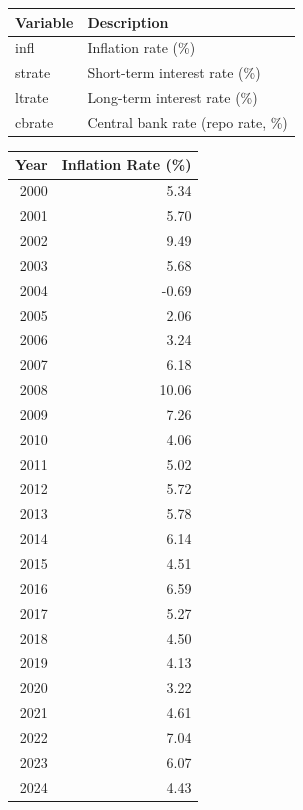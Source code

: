 \documentclass[11pt,preprint]{elsarticle}
\let\origtable\table
\let\endorigtable\endtable
\renewenvironment{table}[1][2] {
    \expandafter\origtable\expandafter[H]
} {
    \endorigtable
}
\numberwithin{equation}{section}
\numberwithin{figure}{section}
\numberwithin{table}{section}
\begin{document}
\begin{table}[H]
\centering
\begin{tabular}{ll}
  \hline
Variable & Description \\ 
  \hline
infl & Inflation rate (\%) \\ 
  strate & Short-term interest rate (\%) \\ 
  ltrate & Long-term interest rate (\%) \\ 
  cbrate & Central bank rate (repo rate, \%) \\ 
   \hline
\end{tabular}
\caption{Variable Descriptions\label{tab21}} 
\end{table}

\begin{table}[H]
\centering
\begin{tabular}{rr}
  \hline
Year & Inflation Rate (\%) \\ 
  \hline
2000 & 5.34 \\ 
  2001 & 5.70 \\ 
  2002 & 9.49 \\ 
  2003 & 5.68 \\ 
  2004 & -0.69 \\ 
  2005 & 2.06 \\ 
  2006 & 3.24 \\ 
  2007 & 6.18 \\ 
  2008 & 10.06 \\ 
  2009 & 7.26 \\ 
  2010 & 4.06 \\ 
  2011 & 5.02 \\ 
  2012 & 5.72 \\ 
  2013 & 5.78 \\ 
  2014 & 6.14 \\ 
  2015 & 4.51 \\ 
  2016 & 6.59 \\ 
  2017 & 5.27 \\ 
  2018 & 4.50 \\ 
  2019 & 4.13 \\ 
  2020 & 3.22 \\ 
  2021 & 4.61 \\ 
  2022 & 7.04 \\ 
  2023 & 6.07 \\ 
  2024 & 4.43 \\ 
   \hline
\end{tabular}
\caption{Annual Inflation Rate in South Africa (2000–2024) \label{tab8}} 
\end{table}
\end{document}
